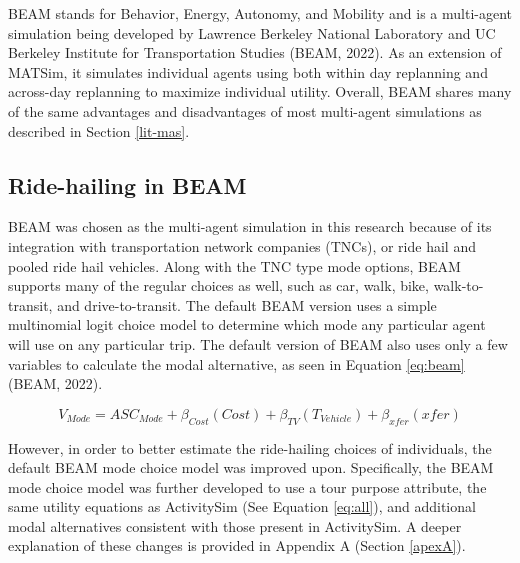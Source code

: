 \documentclass[fancy, masters]{byuthesis}
\begin{document}
BEAM stands for Behavior, Energy, Autonomy, and Mobility and is a multi-agent simulation being developed by Lawrence Berkeley National Laboratory and UC Berkeley Institute for Transportation Studies (BEAM, 2022). As an extension of MATSim, it simulates individual agents using both within day replanning and across-day replanning to maximize individual utility. Overall, BEAM shares many of the same advantages and disadvantages of most multi-agent simulations as described in Section \ref{lit-mas}.

\hypertarget{novel-beam}{%
\subsection{Ride-hailing in BEAM}\label{novel-beam}}

BEAM was chosen as the multi-agent simulation in this research because of its integration with transportation network companies (TNCs), or ride hail and pooled ride hail vehicles. Along with the TNC type mode options, BEAM supports many of the regular choices as well, such as car, walk, bike, walk-to-transit, and drive-to-transit. The default BEAM version uses a simple multinomial logit choice model to determine which mode any particular agent will use on any particular trip. The default version of BEAM also uses only a few variables to calculate the modal alternative, as seen in Equation \eqref{eq:beam} (BEAM, 2022).

\begin{equation}
  V_{Mode} = ASC_{Mode} + \beta_{Cost}(Cost) + \beta_{TV}(T_{Vehicle}) + \beta_{xfer}(xfer) \label{eq:beam}
\end{equation}

However, in order to better estimate the ride-hailing choices of individuals, the default BEAM mode choice model was improved upon. Specifically, the BEAM mode choice model was further developed to use a tour purpose attribute, the same utility equations as ActivitySim (See Equation \eqref{eq:all}), and additional modal alternatives consistent with those present in ActivitySim. A deeper explanation of these changes is provided in Appendix A (Section \ref{apexA}).
\end{document}
